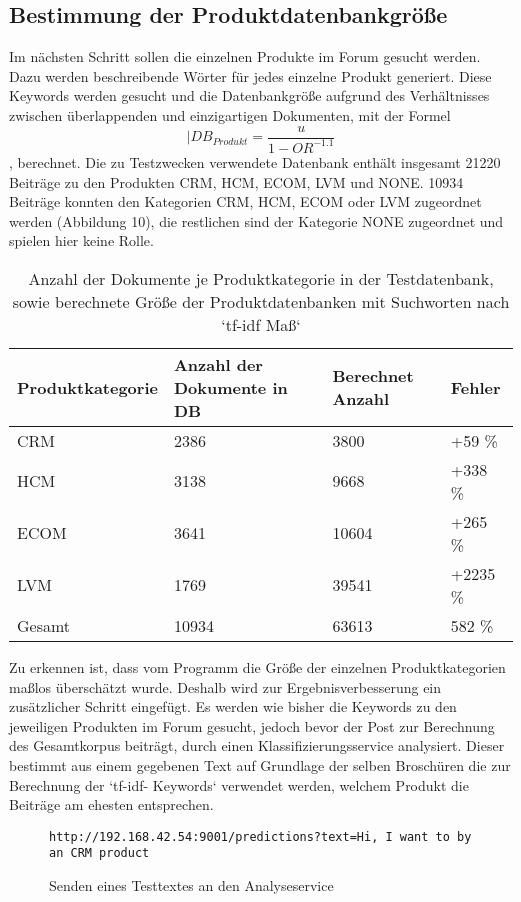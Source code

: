 \subsection{Bestimmung der Produktdatenbankgröße}

Im nächsten Schritt sollen die einzelnen Produkte im Forum gesucht werden. Dazu werden beschreibende Wörter für jedes einzelne Produkt generiert. Diese Keywords werden gesucht und die Datenbankgröße aufgrund des Verhältnisses zwischen überlappenden und einzigartigen Dokumenten, mit der Formel  \[|DB_{Produkt} = \frac{u}{1-OR^{-1.1}}\] \cite{lu2008efficient}, berechnet. Die zu Testzwecken verwendete Datenbank enthält insgesamt 21220 Beiträge zu den Produkten CRM, HCM, ECOM, LVM und NONE. 10934 Beiträge konnten den Kategorien CRM, HCM, ECOM oder LVM zugeordnet werden (Abbildung 10), die restlichen sind der Kategorie NONE zugeordnet und spielen hier keine Rolle.

\begin{table}[h!]
\centering 
\begin{tabular}{ | p{3cm} | l | | l | | l |}
\hline
Produktkategorie & Anzahl der Dokumente in DB & Berechnet Anzahl & Fehler\\ \hline
CRM & 2386 & 3800 & +59 \%\\ \hline
HCM & 3138 & 9668 & +338 \%\\ \hline
ECOM & 3641 & 10604 & +265 \%\\ \hline
LVM & 1769 & 39541 & +2235 \%\\ \hline
Gesamt & 10934 & 63613 & 582 \% \\ \hline
\end{tabular}
\caption{Anzahl der Dokumente je Produktkategorie in der Testdatenbank, sowie berechnete Größe der Produktdatenbanken mit Suchworten nach `tf-idf Maß`}
\end{table}

Zu erkennen ist, dass vom Programm die Größe der einzelnen Produktkategorien maßlos überschätzt wurde. Deshalb wird zur Ergebnisverbesserung ein zusätzlicher Schritt eingefügt. Es werden wie bisher die Keywords zu den jeweiligen Produkten im Forum gesucht, jedoch bevor der Post zur Berechnung des Gesamtkorpus beiträgt, durch einen Klassifizierungsservice \cite{n2o} analysiert. Dieser bestimmt aus einem gegebenen Text auf Grundlage der selben Broschüren die zur Berechnung der `tf-idf- Keywords` verwendet werden, welchem Produkt die Beiträge am ehesten entsprechen.

\begin{figure}[h!]
\begin{lstlisting}[language=HTML5]
http://192.168.42.54:9001/predictions?text=Hi, I want to by an CRM product
\end{lstlisting}
\caption{Senden eines Testtextes an den Analyseservice}
\end{figure}

